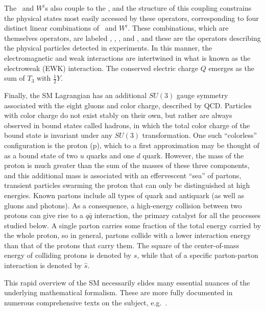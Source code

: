\documentclass[oneside, letterpaper, 12pt, oldfontcommands]{memoir}
\begin{document}
The \PB\ and $W^{i}$s also couple to the \PH, and the structure of this coupling constrains the physical states
most easily accessed by these operators, corresponding to four distinct linear combinations of
\PB\ and $W^{i}$. These combinations, which are themselves operators, are labeled \PZ, \Pgamma, \PWplus, and \PWminus,
and these are the operators describing the physical particles detected in experiments.
In this manner, the electromagnetic and weak interactions are intertwined in what is known as the electroweak (EWK) interaction.
The conserved electric charge $Q$ emerges as the sum of $T_{3}$ with $\frac{1}{2}Y$.

Finally, the SM Lagrangian has an additional $SU(3)$ gauge symmetry associated with the eight gluons and color charge, described by QCD.
Particles with color charge do not exist stably on their own, but rather are always observed in bound states called hadrons, in which the total color
charge of the bound state is invariant under any $SU(3)$ transformation. One such ``colorless'' configuration is the proton (p), which
to a first approximation may be thought of as a bound state of two $u$ quarks and one $d$ quark. However, the mass of the proton is
much greater than the sum of the masses of these three components, and this additional mass is associated with an effervescent ``sea''
of partons, transient particles swarming the proton that can only be distinguished at high energies. Known partons include
all types of quark and antiquark (as well as gluons and photons). As a consequence, a high-energy collision between two protons can give rise to a $q\bar{q}$ interaction,
the primary catalyst for all the processes studied below. A single parton carries some fraction of the total energy carried by the whole proton,
so in general, partons collide with a lower interaction energy than that of the protons that carry them.
The square of the center-of-mass energy of colliding protons is denoted by $s$, while that of a specific
parton-parton interaction is denoted by $\hat{s}$.

This rapid overview of the SM necessarily elides many essential nuances of the underlying mathematical formalism. These are more fully
documented in numerous comprehensive texts on the subject, e.g.~\cite{ref:HalzenMartin, ref:BargerPhillips, ref:PeskinSchroeder, ref:Srednicki, ref:Schwartz}.
\end{document}
